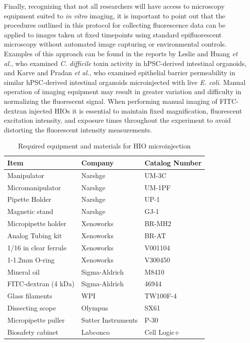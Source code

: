\documentclass[11pt]{article}
\begin{document}
Finally, recognizing that not all researchers will have access to microscopy equipment suited to \emph{in vitro} imaging, it is important to point out that the procedures outlined in this protocol for collecting fluorescence data can be applied to images taken at fixed timepoints using standard epifluorescent microscopy without automated image capturing or environmental controls. Examples of this approach can be found in the reports by Leslie and Huang \emph{et al.}\supercite{Leslie:2015}, who examined \emph{C. difficile} toxin activity in hPSC-derived intestinal organoids, and Karve and Pradan \emph{et al.}\supercite{Karve:2017}, who examined epithelial barrier permeability in similar hPSC-derived intestinal organoids microinjected with live \emph{E. coli}. Manual operation of imaging equipment may result in greater variation and difficulty in normalizing the fluorescent signal. When performing manual imaging of FITC-dextran injected HIOs it is essential to maintain fixed magnification, fluorescent excitation intensity, and exposure times throughout the experiment to avoid distorting the fluorescent intensity measurements.\\
\begin{table}[ht]
\centering
\begin{tabular}{lll}
\textbf{Item} & \textbf{Company} & \textbf{Catalog Number}\\
\hline
Manipulator & Narshge & UM-3C\\
Micromanipulator & Narshge & UM-1PF\\
Pipette Holder & Narshge & UP-1\\
Magnetic stand & Narshge & GJ-1\\
Micropipette holder & Xenoworks & BR-MH2\\
Analog Tubing kit & Xenoworks & BR-AT\\
1/16 in clear ferrule & Xenoworks & V001104\\
1-1.2mm O-ring & Xenoworks & V300450\\
Mineral oil & Sigma-Aldrich & M8410\\
FITC-dextran (4 kDa) & Sigma-Aldrich & 46944\\
Glass filaments & WPI & TW100F-4\\
Dissecting scope & Olympus & SX61\\
Micropipette puller & Sutter Instruments & P-30\\
Biosafety cabinet & Labconco & Cell Logic+\\
\end{tabular}
\caption{Required equipment and materials for HIO microinjection}
\end{table}
\end{document}
